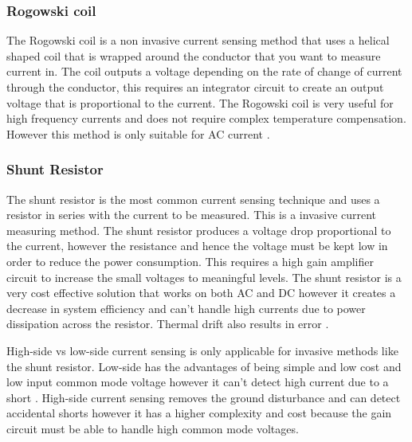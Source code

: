 \subsubsection{Rogowski coil}\label{sec:cursens_coil}
The Rogowski coil is a non invasive current sensing method that uses a helical shaped coil that is wrapped around the conductor that you want to measure current in. The coil outputs a voltage depending on the rate of change of current through the conductor, this requires an integrator circuit to create an output voltage that is proportional to the current. The Rogowski coil is very useful for high frequency currents and does not require complex temperature compensation. However this method is only suitable for AC current \cite{CircuitDigest}.

\subsubsection{Shunt Resistor}\label{sec:cursens_shunt}
The shunt resistor is the most common current sensing technique and uses a resistor in series with the current to be measured. This is a invasive current measuring method. The shunt resistor produces a voltage drop proportional to the current, however the resistance and hence the voltage must be kept low in order to reduce the power consumption. This requires a high gain amplifier circuit to increase the small voltages to meaningful levels. The shunt resistor is a very cost effective solution that works on both AC and DC however it creates a decrease in system efficiency and can't handle high currents due to power dissipation across the resistor. Thermal drift also results in error \cite{CircuitDigest}. 

High-side vs low-side current sensing is only applicable for invasive methods like the shunt resistor. Low-side has the advantages of being simple and low cost and low input common mode voltage however it can't detect high current due to a short \cite{EG_CurSens}. High-side current sensing removes the ground disturbance and can detect accidental shorts however it has a higher complexity and cost because the gain circuit must be able to handle high common mode voltages\cite{EG_CurSens}.  